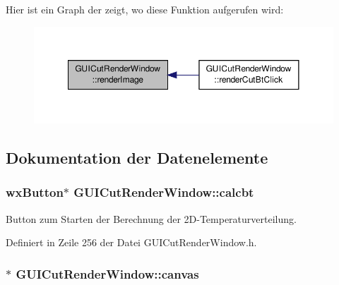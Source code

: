 Hier ist ein Graph der zeigt, wo diese Funktion aufgerufen wird\-:\nopagebreak
\begin{figure}[H]
\begin{center}
\leavevmode
\includegraphics[width=350pt]{classGUICutRenderWindow_a9eedb7088ad31f4680a77ed3a06fa60c_icgraph}
\end{center}
\end{figure}




\subsection{Dokumentation der Datenelemente}
\hypertarget{classGUICutRenderWindow_a7cadc8f5fd1b153ba21aa82fd5f70eff}{
\subsubsection[{calcbt}]{\setlength{\rightskip}{0pt plus 5cm}wx\-Button$\ast$ G\-U\-I\-Cut\-Render\-Window\-::calcbt\hspace{0.3cm}{\ttfamily [private]}}}\label{classGUICutRenderWindow_a7cadc8f5fd1b153ba21aa82fd5f70eff}


Button zum Starten der Berechnung der 2\-D-\/\-Temperaturverteilung. 



Definiert in Zeile 256 der Datei G\-U\-I\-Cut\-Render\-Window.\-h.

\hypertarget{classGUICutRenderWindow_abbaa6c66e8aa9fee96ba20a9a29e1a18}{
\subsubsection[{canvas}]{$\ast$ G\-U\-I\-Cut\-Render\-Window\-::canvas\hspace{0.3cm}{\ttfamily [private]}}}\label{classGUICutRenderWindow_abbaa6c66e8aa9fee96ba20a9a29e1a18}


